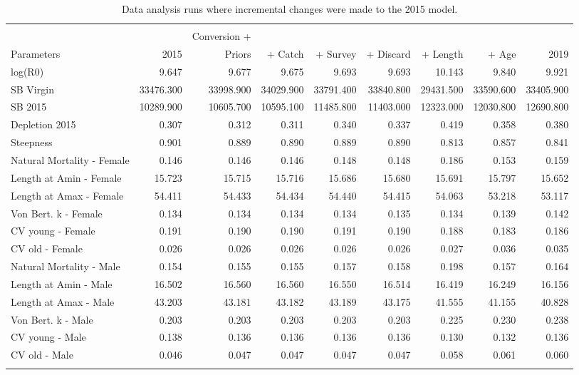 \documentclass[12pt,]{article}
\begin{document}
\begin{landscape}
\begingroup\fontsize{11pt}{12pt}\selectfont
\begin{longtable}{lrrrrrrrr}
\caption{Data analysis runs where incremental changes were made to the 2015 model.} \\ 
  \hline
 &  &  &  &  &  &  &  &  \\ 
             &       & Conversion + &         &           &           &           &       &      \\
 Parameters & 2015  & Priors       & + Catch & + Survey  & + Discard &  + Length & + Age & 2019 \\
 \hline
log(R0) & 9.647 & 9.677 & 9.675 & 9.693 & 9.693 & 10.143 & 9.840 & 9.921 \\ 
  SB Virgin & 33476.300 & 33998.900 & 34029.900 & 33791.400 & 33840.800 & 29431.500 & 33590.600 & 33405.900 \\ 
  SB 2015 & 10289.900 & 10605.700 & 10595.100 & 11485.800 & 11403.000 & 12323.000 & 12030.800 & 12690.800 \\ 
  Depletion 2015 & 0.307 & 0.312 & 0.311 & 0.340 & 0.337 & 0.419 & 0.358 & 0.380 \\ 
  Steepness & 0.901 & 0.889 & 0.890 & 0.889 & 0.890 & 0.813 & 0.857 & 0.841 \\ 
  Natural Mortality - Female & 0.146 & 0.146 & 0.146 & 0.148 & 0.148 & 0.186 & 0.153 & 0.159 \\ 
  Length at Amin - Female & 15.723 & 15.715 & 15.716 & 15.686 & 15.680 & 15.691 & 15.797 & 15.652 \\ 
  Length at Amax - Female & 54.411 & 54.433 & 54.434 & 54.440 & 54.415 & 54.063 & 53.218 & 53.117 \\ 
  Von Bert. k - Female & 0.134 & 0.134 & 0.134 & 0.134 & 0.135 & 0.134 & 0.139 & 0.142 \\ 
  CV young - Female & 0.191 & 0.190 & 0.190 & 0.191 & 0.190 & 0.188 & 0.183 & 0.186 \\ 
  CV old - Female & 0.026 & 0.026 & 0.026 & 0.026 & 0.026 & 0.027 & 0.036 & 0.035 \\ 
  Natural Mortality - Male & 0.154 & 0.155 & 0.155 & 0.157 & 0.158 & 0.198 & 0.157 & 0.164 \\ 
  Length at Amin - Male & 16.502 & 16.560 & 16.560 & 16.550 & 16.514 & 16.419 & 16.249 & 16.156 \\ 
  Length at Amax - Male & 43.203 & 43.181 & 43.182 & 43.189 & 43.175 & 41.555 & 41.155 & 40.828 \\ 
  Von Bert. k - Male & 0.203 & 0.203 & 0.203 & 0.203 & 0.203 & 0.225 & 0.230 & 0.238 \\ 
  CV young - Male & 0.138 & 0.136 & 0.136 & 0.136 & 0.136 & 0.130 & 0.132 & 0.136 \\ 
  CV old - Male & 0.046 & 0.047 & 0.047 & 0.047 & 0.047 & 0.058 & 0.061 & 0.060 \\ 
   \hline
\hline
\label{tab:bridge_table}
\end{longtable}
\endgroup
\end{landscape}
\end{document}
